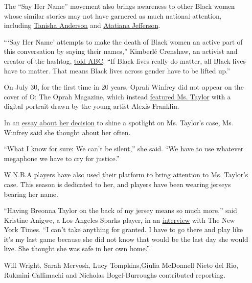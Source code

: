 The ``Say Her Name'' movement also brings awareness to other Black women
whose similar stories may not have garnered as much national attention,
including
\href{https://www.nytimes3xbfgragh.onion/2015/05/25/us/71-arrested-in-cleveland-protests-over-officers-acquittal-police-say.html}{Tanisha
Anderson} and
\href{https://www.nytimes3xbfgragh.onion/2019/10/15/us/aaron-dean-atatiana-jefferson.html}{Atatiana
Jefferson}.

```Say Her Name' attempts to make the death of Black women an active
part of this conversation by saying their names,'' Kimberlé Crenshaw, an
activist and creator of the hashtag,
\href{https://twitter.com/GMA/status/1268881611011039234?ref_src=twsrc\%5Etfw\%7Ctwcamp\%5Etweetembed\%7Ctwterm\%5E1268881611011039234\&ref_url=https\%3A\%2F\%2Fpeople.com\%2Fcrime\%2Fbreonna-taylors-mom-mourns-daughter-on-what-wouldve-been-her-27th-birthday\%2F}{told
ABC}. ``If Black lives really do matter, all Black lives have to matter.
That means Black lives across gender have to be lifted up.''

On July 30, for the first time in 20 years, Oprah Winfrey did not appear
on the cover of O: The Oprah Magazine, which instead
\href{https://www.nytimes3xbfgragh.onion/2020/07/30/business/media/oprah-magazine-breonna-taylor-cover.html}{featured
Ms. Taylor} with a digital portrait drawn by the young artist Alexis
Franklin.

In an
\href{https://www.oprahmag.com/life/a33449982/oprah-breonna-taylor/}{essay
about her decision} to shine a spotlight on Ms. Taylor's case, Ms.
Winfrey said she thought about her often.

``What I know for sure: We can't be silent,'' she said. ``We have to use
whatever megaphone we have to cry for justice.''

W.N.B.A players have also used their platform to bring attention to Ms.
Taylor's case. This season is dedicated to her, and players have been
wearing jerseys bearing her name.

``Having Breonna Taylor on the back of my jersey means so much more,''
said Kristine Anigwe, a Los Angeles Sparks player, in an
\href{https://www.nytimes3xbfgragh.onion/2020/08/28/sports/basketball/kristine-anigwe-wnba-sparks.html}{interview}
with The New York Times. ``I can't take anything for granted. I have to
go there and play like it's my last game because she did not know that
would be the last day she would live. She thought she was safe in her
own home.''

Will Wright, Sarah Mervosh, Lucy Tompkins,Giulia McDonnell Nieto del
Rio, Rukmini Callimachi and Nicholas Bogel-Burroughs contributed
reporting.

